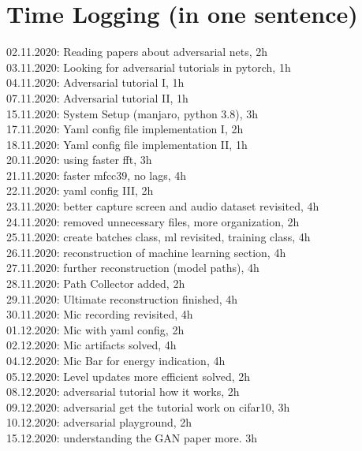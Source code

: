 \section{Time Logging (in one sentence)}

02.11.2020: Reading papers about adversarial nets, 2h\\
03.11.2020: Looking for adversarial tutorials in pytorch, 1h\\
04.11.2020: Adversarial tutorial I, 1h\\
07.11.2020: Adversarial tutorial II, 1h\\
15.11.2020: System Setup (manjaro, python 3.8), 3h\\
17.11.2020: Yaml config file implementation I, 2h\\

18.11.2020: Yaml config file implementation II, 1h\\
20.11.2020: using faster fft, 3h\\
21.11.2020: faster mfcc39, no lags, 4h\\
22.11.2020: yaml config III, 2h\\

23.11.2020: better capture screen and audio dataset revisited, 4h\\
24.11.2020: removed unnecessary files, more organization, 2h\\
25.11.2020: create batches class, ml revisited, training class, 4h\\

26.11.2020: reconstruction of machine learning section, 4h\\
27.11.2020: further reconstruction (model paths), 4h\\
28.11.2020: Path Collector added, 2h\\

29.11.2020: Ultimate reconstruction finished, 4h\\
30.11.2020: Mic recording revisited, 4h\\
01.12.2020: Mic with yaml config, 2h\\

02.12.2020: Mic artifacts solved, 4h\\
04.12.2020: Mic Bar for energy indication, 4h\\
05.12.2020: Level updates more efficient solved, 2h\\

08.12.2020: adversarial tutorial how it works, 2h\\
09.12.2020: adversarial get the tutorial work on cifar10, 3h\\
10.12.2020: adversarial playground, 2h\\
15.12.2020: understanding the GAN paper more. 3h\\

